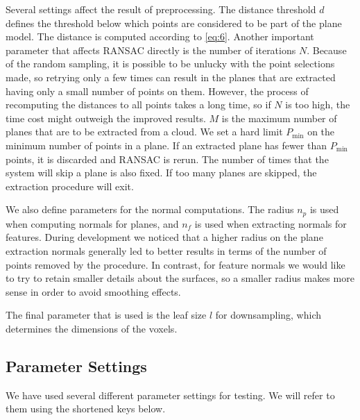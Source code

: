 \documentclass[11pt,a4paper]{kth-mag}
\begin{document}
Several settings affect the result of preprocessing. The distance threshold $d$
defines the threshold below which points are considered to be part of the plane
model. The distance is computed according to \eqref{eq:6}. Another
important parameter that affects RANSAC directly is the number of iterations
$N$. Because of the random sampling, it is possible to be unlucky with the point
selections made, so retrying only a few times can result in the planes that are
extracted having only a small number of points on them. However, the process of
recomputing the distances to all points takes a long time, so if $N$ is too
high, the time cost might outweigh the improved results. $M$ is the maximum
number of planes that are to be extracted from a cloud. We set a hard limit
$P_{\min}$ on the minimum number of points in a plane. If an extracted plane has
fewer than $P_{\min}$ points, it is discarded and RANSAC is rerun. The number of
times that the system will skip a plane is also fixed. If too many planes are
skipped, the extraction procedure will exit.

We also define parameters for the normal computations. The radius $n_p$ is used
when computing normals for planes, and $n_f$ is used when extracting normals for
features. During development we noticed that a higher radius on the plane
extraction normals generally led to better results in terms of the number of
points removed by the procedure. In contrast, for feature normals we would like
to try to retain smaller details about the surfaces, so a smaller radius makes
more sense in order to avoid smoothing effects.

The final parameter that is used is the leaf size $l$ for downsampling, which
determines the dimensions of the voxels.

\subsection{Parameter Settings}
We have used several different parameter settings for testing. We will refer to
them using the shortened keys below.
\end{document}
